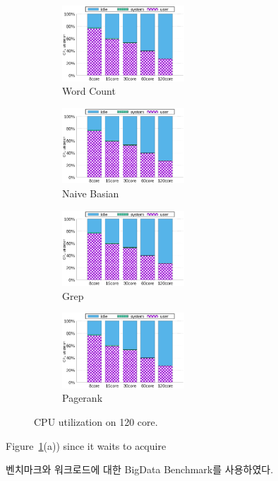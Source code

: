 \begin{figure}[tb]
    \centering
    \begin{subfigure}[b]{0.25\textwidth}
        \includegraphics[width=1.8in]{graph/wc_cpuutils.eps}
        \caption{Word Count}
    \end{subfigure}%
    \begin{subfigure}[b]{0.25\textwidth}
        \includegraphics[width=1.8in]{graph/wc_cpuutils.eps}
        \caption{Naive Basian}
    \end{subfigure}%
    \begin{subfigure}[b]{0.25\textwidth}
        \includegraphics[width=1.8in]{graph/wc_cpuutils.eps}
        \caption{Grep}
    \end{subfigure}%
        \begin{subfigure}[b]{0.25\textwidth}
        \includegraphics[width=1.8in]{graph/wc_cpuutils.eps}
        \caption{Pagerank}
    \end{subfigure}
        \centering
    \caption{CPU utilization on 120 core.}
    \label{fig:utilization}
\end{figure}
Figure~\ref{fig:utilization}(a)) since it waits to acquire

\ifkor
벤치마크와 워크로드에 대한 BigData Benchmark를 사용하였다.
\else

